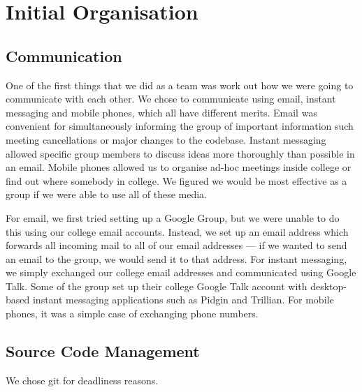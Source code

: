 \section{Initial Organisation}
\subsection{Communication}
One of the first things that we did as a team was work out how we were going to communicate with each other. We chose to communicate using email, instant messaging and mobile phones, which all have different merits. Email was convenient for simultaneously informing the group of important information such meeting cancellations or major changes to the codebase. Instant messaging allowed specific group members to discuss ideas more thoroughly than possible in an email. Mobile phones allowed us to organise ad-hoc meetings inside college or find out where somebody in college. We figured we would be most effective as a group if we were able to use all of these media.

For email, we first tried setting up a Google Group, but we were unable to do this using our college email accounts. Instead, we set up an email address which forwards all incoming mail to all of our email addresses --- if we wanted to send an email to the group, we would send it to that address. For instant messaging, we simply exchanged our college email addresses and communicated using Google Talk. Some of the group set up their college Google Talk account with desktop-based instant messaging applications such as Pidgin and Trillian. For mobile phones, it was a simple case of exchanging phone numbers.

\subsection{Source Code Management}
We chose git for deadliness reasons.
